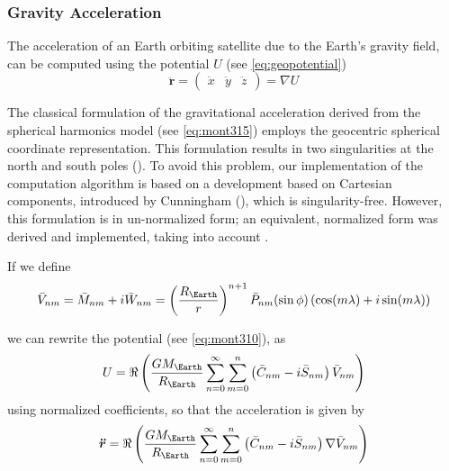 \subsubsection{Gravity Acceleration}\label{sssec:gravity-acceleration}

The acceleration of an Earth orbiting satellite due to the Earth's gravity field, 
can be computed using the potential $U$ (see \ref{eq:geopotential})
\begin{equation}
  \bm{\ddot{r}} =  
    \begin{pmatrix} \ddot{x} & \ddot{y} & \ddot{z} \end{pmatrix} = 
    \nabla U
\end{equation}

The classical formulation of the gravitational acceleration derived from the spherical 
harmonics model (see \ref{eq:mont315}) employs the geocentric spherical coordinate 
representation. This formulation results in two singularities at the north and 
south poles (\cite{Atallah2022}). To avoid this problem, our implementation of the 
computation algorithm is based on a development based on Cartesian components, introduced by 
Cunningham (\cite{Cunningham1970}), which is singularity-free. However, this formulation 
is in un-normalized form; an equivalent, normalized form was derived and implemented, 
taking into account \cite{Atallah2022}.

If we define 
\begin{equation}
  \bar{V}_{nm} = \bar{M}_{nm} + i \bar{W}_{nm} = 
    \left( \frac{R_{\Earth}}{r} \right) ^{n+1} \bar{P}_{nm} (\sin \phi) 
      \left( \cos (m\lambda) + i \sin (m\lambda) \right)
\end{equation}

we can rewrite the potential (see \ref{eq:mont310}), as
\begin{equation}
  U = \Re \left( \frac{GM_{\Earth}}{R_{\Earth}} \sum_{n=0}^{\infty} \sum_{m=0}^{n} 
    \left( \bar{C}_{nm} - i \bar{S}_{nm} \right) \bar{V}_{nm} \right)
\end{equation}
using normalized coefficients, so that the acceleration is given by
\begin{equation}
  \bm{\ddot{r}} = \Re \left( \frac{GM_{\Earth}}{R_{\Earth}} \sum_{n=0}^{\infty} \sum_{m=0}^{n} 
    \left( \bar{C}_{nm} - i \bar{S}_{nm} \right) \nabla \bar{V}_{nm} \right)
\end{equation}

